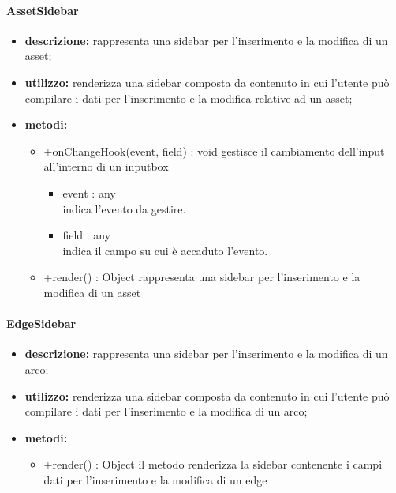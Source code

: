 \paragraph{AssetSidebar}
\begin{itemize}
	\item \textbf{descrizione:} rappresenta una sidebar per l'inserimento e la modifica di un asset;
	\item \textbf{utilizzo:} renderizza una sidebar composta da contenuto in cui l'utente può compilare i dati per l'inserimento e la modifica relative ad un asset;
	\item \textbf{metodi:}
	\begin{itemize}
		\item +onChangeHook(event, field) : void\newline
		gestisce il cambiamento dell'input all'interno di un inputbox
		\begin{itemize}
			\item event : any\\
			indica l'evento da gestire.
			\item field : any\\
			indica il campo su cui è accaduto l'evento.
		\end{itemize}
		\item +render() : Object\newline
		rappresenta una sidebar per l'inserimento e la modifica di un asset
	\end{itemize}
\end{itemize}
\paragraph{EdgeSidebar}
\begin{itemize}
	\item \textbf{descrizione:} rappresenta una sidebar per l'inserimento e la modifica di un arco;
	\item \textbf{utilizzo:} renderizza una sidebar composta da contenuto in cui l'utente può compilare i dati per l'inserimento e la modifica di un arco;
	\item \textbf{metodi:}
	\begin{itemize}
		\item +render() : Object\newline
		il metodo renderizza la sidebar contenente i campi dati per l'inserimento e la modifica di un edge
	\end{itemize}
\end{itemize}

